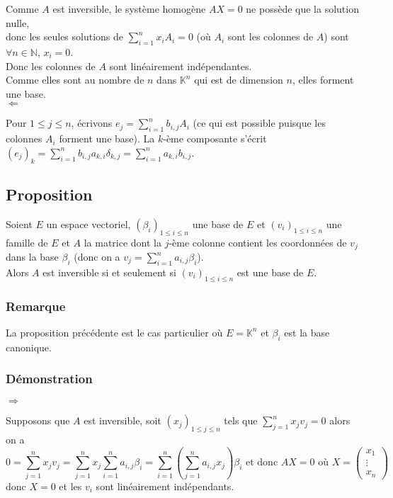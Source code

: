 \documentclass[a4paper,10pt]{book} %
\newcommand{\N}{\mathbb{N}}
\newcommand{\K}{\mathbb{K}}
\begin{document}
Comme $A$ est inversible, le système homogène $AX=0$ ne possède que la solution nulle,\\
donc les seules solutions de $\sum\limits_{i=1}^n x_iA_i=0$ (où $A_i$ sont les colonnes de $A$) sont $\forall n\in\N$, $x_i=0$.\\

Donc les colonnes de $A$ sont linéairement indépendantes.\\
Comme elles sont au nombre de $n$ dans $\K^n$ qui est de dimension $n$, elles forment une base.\\

$\Leftarrow$

Pour $1\leq j\leq n$, écrivons $e_j=\sum\limits_{i=1}^nb_{i,j}A_i$ (ce qui est possible puisque les colonnes $A_i$ forment une base). La $k$-ème composante s'écrit $(e_j)_k=\sum\limits_{i=1}^n b_{i,j}a_{k,i}
\delta_{k,j}=\sum\limits_{i=1}^na_{k,i}b_{i,j}$.

\subsection{Proposition}
Soient $E$ un espace vectoriel, $(\beta_i)_{1\leq i\leq n}$ une base de $E$ et $(v_i)_{1\leq i\leq n}$ une famille de $E$ et $A$ la matrice dont la $j$-ème colonne contient les coordonnées de $v_j$ dans la base $\beta_i$ (donc on a $v_j=\sum\limits_{i=1}^n a_{i,j}\beta_i$).\\

Alors $A$ est inversible si et seulement si $(v_i)_{1\leq i \leq n}$ est une base de $E$.

\subsubsection{Remarque}
La proposition précédente est le cas particulier où $E=\K^n$ et $\beta_i$ est la base canonique.

\newpage

\subsubsection{Démonstration}
$\Rightarrow$

Supposons que $A$ est inversible, soit $(x_j)_{1\leq j\leq n}$ tels que $\sum\limits_{j=1}^n x_jv_j=0$ alors on a
$$0=\sum\limits_{j=1}^n x_jv_j=\sum\limits_{j=1}^nx_j \sum\limits_{i=1}^n a_{i,j}\beta_i=\sum\limits_{i=1}^n(\sum\limits_{j=1}^n a_{i,j}x_j)\beta_i\text{ et donc }AX=0\text{ où } X=\begin{pmatrix}x_1 \\ \vdots \\ x_n \end{pmatrix}$$
donc $X=0$ et les $v_i$ sont linéairement indépendants.\\
\end{document}
